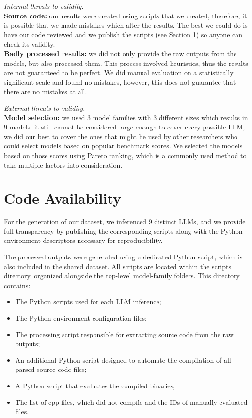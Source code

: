 \textit{Internal threats to validity.}
\\
\textbf{Source code:} our results were created using scripts that we created, therefore, it is possible that we made mistakes which alter the results.
The best we could do is have our code reviewed and we publish the scripts (see Section \ref{th4:section:code_availability}) so anyone can check its validity.
\\
\textbf{Badly processed results:} we did not only provide the raw outputs from the models, but also processed them.
This process involved heuristics, thus the results are not guaranteed to be perfect.
We did manual evaluation on a statistically significant scale and found no mistakes, however, this does not guarantee that there are no mistakes at all.


\textit{External threats to validity.}
\\
\textbf{Model selection:} we used 3 model families with 3 different sizes which results in 9 models, it still cannot be considered large enough to cover every possible LLM, we did our best to cover the ones that might be used by other researchers who could select models based on popular benchmark scores.
We selected the models based on those scores using Pareto ranking, which is a commonly used method to take multiple factors into consideration.

\section{Code Availability}
\label{th4:section:code_availability}

For the generation of our dataset, we inferenced 9 distinct LLMs, and we provide full transparency by publishing the corresponding scripts along with the Python environment descriptors necessary for reproducibility.

The processed outputs were generated using a dedicated Python script, which is also included in the shared dataset.
All scripts are located within the scripts directory, organized alongside the top-level model-family folders.
This directory contains:
\begin{itemize}
	\item The Python scripts used for each LLM inference;
	\item The Python environment configuration files;
	\item The processing script responsible for extracting source code from the raw outputs;
	\item An additional Python script designed to automate the compilation of all parsed source code files;
	\item A Python script that evaluates the compiled binaries;
	\item The list of cpp files, which did not compile and the IDs of manually evaluated files.
\end{itemize}

